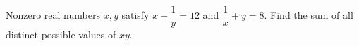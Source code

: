 Nonzero real numbers $x,y$ satisfy $x+\dfrac{1}{y}=12$ and $\dfrac{1}{x}+y=8$. Find the sum of all distinct possible values of $xy$.
